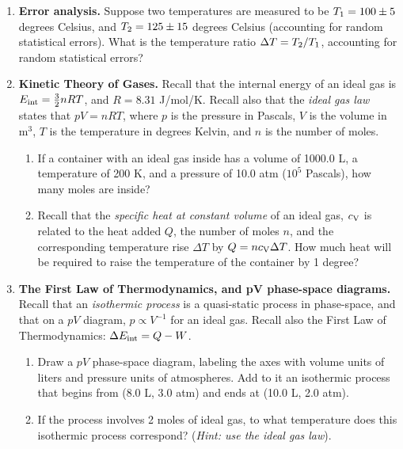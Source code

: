 \documentclass[10pt]{article}
\begin{document}
\begin{enumerate}
\begin{enumerate}
\end{enumerate}
\item \textbf{Error analysis.}  Suppose two temperatures are measured to be $T_{\rm 1} = 100 \pm 5$ degrees Celsius, and $T_{\rm 2} = 125 \pm 15$ degrees Celsius (accounting for random statistical errors).  What is the temperature ratio $\Delta T = T_{\rm 2}/T_{\rm 1}$, accounting for random statistical errors? \\ \vspace{2cm}
\item \textbf{Kinetic Theory of Gases.} Recall that the internal energy of an ideal gas is $E_{\rm int} = \frac{3}{2}n R T$, and $R = 8.31$ J/mol/K.  Recall also that the \textit{ideal gas law} states that $pV = n R T$, where $p$ is the pressure in Pascals, $V$ is the volume in m$^3$, $T$ is the temperature in degrees Kelvin, and $n$ is the number of moles.
\begin{enumerate}
\item If a container with an ideal gas inside has a volume of 1000.0 L, a temperature of 200 K, and a pressure of 10.0 atm ($10^5$ Pascals), how many moles are inside? \\ \vspace{2cm}
\item Recall that the \textit{specific heat at constant volume} of an ideal gas, $c_{\rm V}$ is related to the heat added $Q$, the number of moles $n$, and the corresponding temperature rise $\Delta T$ by $Q = n c_{\rm V} \Delta T$.  How much heat will be required to raise the temperature of the container by 1 degree? \\ \vspace{2cm}
\end{enumerate}
\item \textbf{The First Law of Thermodynamics, and pV phase-space diagrams.}  Recall that an \textit{isothermic process} is a quasi-static process in phase-space, and that on a $pV$ diagram, $p \propto V^{-1}$ for an ideal gas.  Recall also the First Law of Thermodynamics: $\Delta E_{\rm int} = Q - W$.
\begin{enumerate}
\item Draw a $pV$ phase-space diagram, labeling the axes with volume units of liters and pressure units of atmospheres.  Add to it an isothermic process that begins from (8.0 L, 3.0 atm) and ends at (10.0 L, 2.0 atm). \\ \vspace{3cm}
\item If the process involves 2 moles of ideal gas, to what temperature does this isothermic process correspond?  (\textit{Hint: use the ideal gas law}). \\ \vspace{2cm}

\end{enumerate}
\end{enumerate}
\end{document}
